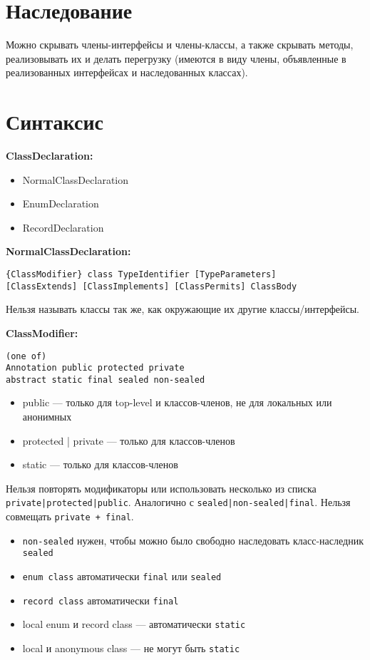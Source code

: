 \documentclass[a4paper,12pt]{article}
\begin{document}
\section*{Наследование}
Можно скрывать члены-интерфейсы и члены-классы, а также скрывать методы, реализовывать их и делать перегрузку (имеются в виду члены, объявленные в реализованных интерфейсах и наследованных классах).

\section*{Синтаксис}

\textbf{ClassDeclaration:}
\begin{itemize}
  \item NormalClassDeclaration
  \item EnumDeclaration
  \item RecordDeclaration
\end{itemize}

\textbf{NormalClassDeclaration:}
\begin{verbatim}
{ClassModifier} class TypeIdentifier [TypeParameters]
[ClassExtends] [ClassImplements] [ClassPermits] ClassBody
\end{verbatim}

Нельзя называть классы так же, как окружающие их другие классы/интерфейсы.

\textbf{ClassModifier:}
\begin{verbatim}
(one of)
Annotation public protected private
abstract static final sealed non-sealed
\end{verbatim}

\begin{itemize}
  \item public — только для top-level и классов-членов, не для локальных или анонимных
  \item protected | private — только для классов-членов
  \item static — только для классов-членов
\end{itemize}

Нельзя повторять модификаторы или использовать несколько из списка \texttt{private|protected|public}. Аналогично с \texttt{sealed|non-sealed|final}. Нельзя совмещать \texttt{private + final}.

\begin{itemize}
  \item \texttt{non-sealed} нужен, чтобы можно было свободно наследовать класс-наследник \texttt{sealed}
  \item \texttt{enum class} автоматически \texttt{final} или \texttt{sealed}
  \item \texttt{record class} автоматически \texttt{final}
  \item local enum и record class — автоматически \texttt{static}
  \item local и anonymous class — не могут быть \texttt{static}
\end{itemize}
\end{document}
